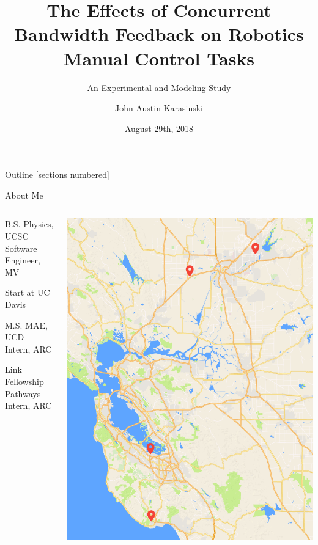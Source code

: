 \documentclass[10pt]{beamer}
\title{The Effects of Concurrent Bandwidth Feedback on Robotics Manual Control Tasks}
\subtitle{An Experimental and Modeling Study}
\date{August 29th, 2018}
\author{John Austin Karasinski}
\institute{Qualifying Examination}
\begin{document}
\maketitle

\begin{frame}{Outline}
  [sections numbered]
  \tableofcontents[]
\end{frame}

\begin{frame}[fragile]{About Me}
  \begin{columns}[T]
    \begin{column}{.5\textwidth}
      \begin{description}[align=right]
        \setlength\itemsep{1em}
        \item [2012] B.S. Physics, UCSC\\
              Software Engineer, MV
        \item [2013] Start at UC Davis
        \item [2016] M.S. MAE, UCD\\
              Intern, ARC
        \item [2017] Link Fellowship\\
              Pathways Intern, ARC
      \end{description}
    \end{column}
    \begin{column}{.5\textwidth}
      \includegraphics[width=\textwidth]{../img/california.png}
    \end{column}
  \end{columns}
\end{frame}
\end{document}
